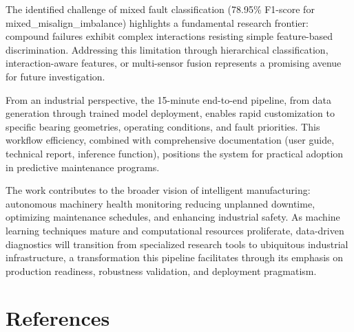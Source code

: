 \documentclass[11pt,a4paper]{article}
\begin{document}
The identified challenge of mixed fault classification (78.95\% F1-score for mixed\_misalign\_imbalance) highlights a fundamental research frontier: compound failures exhibit complex interactions resisting simple feature-based discrimination. Addressing this limitation through hierarchical classification, interaction-aware features, or multi-sensor fusion represents a promising avenue for future investigation.

From an industrial perspective, the 15-minute end-to-end pipeline, from data generation through trained model deployment, enables rapid customization to specific bearing geometries, operating conditions, and fault priorities. This workflow efficiency, combined with comprehensive documentation (user guide, technical report, inference function), positions the system for practical adoption in predictive maintenance programs.

The work contributes to the broader vision of intelligent manufacturing: autonomous machinery health monitoring reducing unplanned downtime, optimizing maintenance schedules, and enhancing industrial safety. As machine learning techniques mature and computational resources proliferate, data-driven diagnostics will transition from specialized research tools to ubiquitous industrial infrastructure, a transformation this pipeline facilitates through its emphasis on production readiness, robustness validation, and deployment pragmatism.

\section{References}
\end{document}
